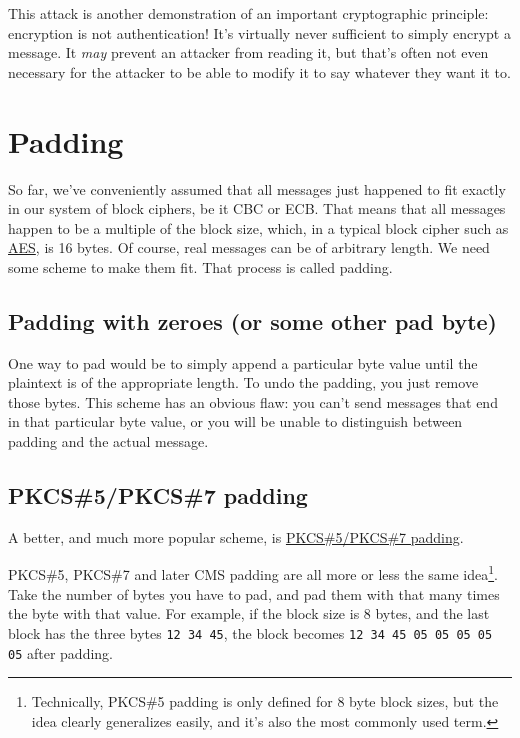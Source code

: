 \documentclass[11pt,ebook,table,dvipsnames]{memoir}
\begin{document}
This attack is another demonstration of an important cryptographic
principle: encryption is not authentication! It's virtually never
sufficient to simply encrypt a message. It \emph{may} prevent an attacker
from reading it, but that's often not even necessary for the attacker
to be able to modify it to say whatever they want it to.
\section{Padding}
\label{sec-2-3-6}

So far, we've conveniently assumed that all messages just happened to
fit exactly in our system of block ciphers, be it CBC or ECB. That
means that all messages happen to be a multiple of the block size,
which, in a typical block cipher such as \hyperref[AES]{AES}, is 16 bytes. Of course,
real messages can be of arbitrary length. We need some scheme to make
them fit. That process is called padding.

\subsection{Padding with zeroes (or some other pad byte)}
\label{sec-2-3-6-1}

One way to pad would be to simply append a particular byte value until
the plaintext is of the appropriate length. To undo the padding, you
just remove those bytes. This scheme has an obvious flaw: you can't
send messages that end in that particular byte value, or you will be
unable to distinguish between padding and the actual message.
\subsection{\label{PKCS-5/PKCS-7-padding}PKCS\#5/PKCS\#7 padding}
\label{sec-2-3-6-2}

A better, and much more popular scheme, is \hyperref[PKCS-5/PKCS-7-padding]{PKCS\#5/PKCS\#7 padding}.

PKCS\#5, PKCS\#7 and later CMS padding are all more or less the same
idea\footnote{Technically, PKCS\#5 padding is only defined for 8 byte block
sizes, but the idea clearly generalizes easily, and it's also the most
commonly used term.}. Take the number of bytes you have to pad, and
pad them with that many times the byte with that value. For example,
if the block size is 8 bytes, and the last block has the three bytes
\texttt{12 34 45}, the block becomes \texttt{12 34 45 05 05 05 05 05} after padding.
\end{document}
